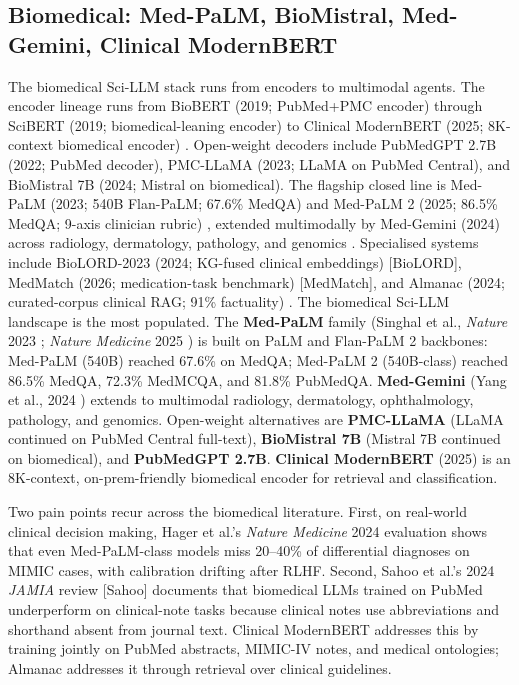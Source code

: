 \documentclass{article}
\begin{document}
\subsection{Biomedical: Med-PaLM, BioMistral, Med-Gemini, Clinical ModernBERT}\label{biomedical-med-palm-biomistral-med-gemini-clinical-modernbert}

The biomedical Sci-LLM stack runs from encoders to multimodal agents. The encoder lineage runs from BioBERT (2019; PubMed+PMC encoder) \cite{lee2019bioinformatics2019} through SciBERT (2019; biomedical-leaning encoder) \cite{beltagy2019arxiv1903106762019} to Clinical ModernBERT (2025; 8K-context biomedical encoder) \cite{lee2025arxiv2504039642025}. Open-weight decoders include PubMedGPT 2.7B (2022; PubMed decoder), PMC-LLaMA (2023; LLaMA on PubMed Central), and BioMistral 7B (2024; Mistral on biomedical). The flagship closed line is Med-PaLM (2023; 540B Flan-PaLM; 67.6\% MedQA) \cite{singhal2023largelanguagemodel} and Med-PaLM 2 (2025; 86.5\% MedQA; 9-axis clinician rubric) \cite{singhal2025towardexpertlevelm}, extended multimodally by Med-Gemini (2024) across radiology, dermatology, pathology, and genomics \cite{yang2024advancingmultimoda}. Specialised systems include BioLORD-2023 (2024; KG-fused clinical embeddings) {[}BioLORD{]}, MedMatch (2026; medication-task benchmark) {[}MedMatch{]}, and Almanac (2024; curated-corpus clinical RAG; 91\% factuality) \cite{zakka2024almanacretrievalau}. The biomedical Sci-LLM landscape is the most populated. The \textbf{Med-PaLM} family (Singhal et al., \emph{Nature} 2023 \cite{singhal2023largelanguagemodel}; \emph{Nature Medicine} 2025 \cite{singhal2025towardexpertlevelm}) is built on PaLM and Flan-PaLM 2 backbones: Med-PaLM (540B) reached 67.6\% on MedQA; Med-PaLM 2 (540B-class) reached 86.5\% MedQA, 72.3\% MedMCQA, and 81.8\% PubMedQA. \textbf{Med-Gemini} (Yang et al., 2024 \cite{yang2024advancingmultimoda}) extends to multimodal radiology, dermatology, ophthalmology, pathology, and genomics. Open-weight alternatives are \textbf{PMC-LLaMA} (LLaMA continued on PubMed Central full-text), \textbf{BioMistral 7B} (Mistral 7B continued on biomedical), and \textbf{PubMedGPT 2.7B}. \textbf{Clinical ModernBERT} (2025) \cite{lee2025arxiv2504039642025} is an 8K-context, on-prem-friendly biomedical encoder for retrieval and classification.

Two pain points recur across the biomedical literature. First, on real-world clinical decision making, Hager et al.'s \emph{Nature Medicine} 2024 evaluation \cite{hager2024evaluationandmitig} shows that even Med-PaLM-class models miss 20--40\% of differential diagnoses on MIMIC cases, with calibration drifting after RLHF. Second, Sahoo et al.'s 2024 \emph{JAMIA} review {[}Sahoo{]} documents that biomedical LLMs trained on PubMed underperform on clinical-note tasks because clinical notes use abbreviations and shorthand absent from journal text. Clinical ModernBERT \cite{lee2025arxiv2504039642025} addresses this by training jointly on PubMed abstracts, MIMIC-IV notes, and medical ontologies; Almanac \cite{zakka2024almanacretrievalau} addresses it through retrieval over clinical guidelines.
\end{document}
